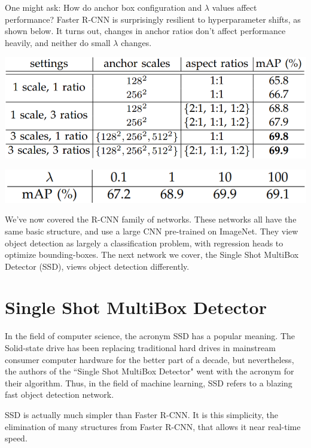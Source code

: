 \documentclass{article}
\begin{document}
One might ask: How do anchor box configuration and $\lambda$ values affect performance? Faster R-CNN is surprisingly resilient to hyperparameter shifts, as shown below. It turns out, changes in anchor ratios don't affect performance heavily, and neither do small $\lambda$ changes.

\begin{center}
\includegraphics[scale=0.5]{anchorperformance.PNG}
\end{center}

\begin{center}
\includegraphics[scale=0.5]{lambdaperformance.PNG}
\end{center}

We've now covered the R-CNN family of networks. These networks all have the same basic structure, and use a large CNN pre-trained on ImageNet. They view object detection as largely a classification problem, with regression heads to optimize bounding-boxes. The next network we cover, the Single Shot MultiBox Detector (SSD), views object detection differently.

\section{Single Shot MultiBox Detector}
In the field of computer science, the acronym SSD has a popular meaning. The Solid-state drive has been replacing traditional hard drives in mainstream consumer computer hardware for the better part of a decade, but nevertheless, the authors of the ``Single Shot MultiBox Detector" went with the acronym for their algorithm. Thus, in the field of machine learning, SSD refers to a blazing fast object detection network.

SSD is actually much simpler than Faster R-CNN. It is this simplicity, the elimination of many structures from Faster R-CNN, that allows it near real-time speed.
\end{document}
